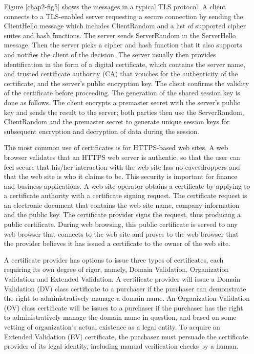 \begin{multicols}{2}
Figure \ref{chap2-fig5} shows the messages in a typical TLS protocol. A client connects to a TLS-enabled server requesting a secure connection by sending the ClientHello message which includes ClientRandom and a list of supported cipher suites and hash functions. The server sends ServerRandom in the ServerHello message. Then the server picks a cipher and hash function that it also supports and notifies the client of the decision. The server usually then provides identification in the form of a digital certificate, which contains the server name, and trusted certificate authority (CA) that vouches for the authenticity of the certificate, and the server's public encryption key. The client confirms the validity of the certificate before proceeding. The generation of the shared session key is done as follows. The client encrypts a premaster secret with the server's public key and sends the result to the server; both parties then use the ServerRandom, ClientRandom and the premaster secret to generate unique session keys for subsequent encryption and decryption of data during the session.

The most common use of certificates is for HTTPS-based web sites. A web browser validates that an HTTPS web server is authentic, so that the user can feel secure that his/her interaction with the web site has no eavesdroppers and that the web site is who it claims to be. This security is important for finance and business applications. A web site operator obtains a certificate by applying to a certificate authority with a certificate signing request. The certificate request is an electronic document that contains the web site name, company information and the public key. The certificate provider signs the request, thus producing a public certificate. During web browsing, this public certificate is served to any web browser that connects to the web site and proves to the web browser that the provider believes it has issued a certificate to the owner of the web site.

A certificate provider has options to issue three types of certificates, each requiring its own degree of rigor, namely, Domain Validation, Organization Validation and Extended Validation. A certificate provider will issue a Domain Validation (DV) class certificate to a purchaser if the purchaser can demonstrate the right to administratively manage a domain name. An Organization Validation (OV) class certificate will be issues to a purchaser if the purchaser has the right to administratively manage the domain name in question, and based on some vetting of organization's actual existence as a legal entity. To acquire an Extended Validation (EV) certificate, the purchaser must persuade the certificate provider of its legal identity, including manual verification checks by a human.
\end{multicols}

